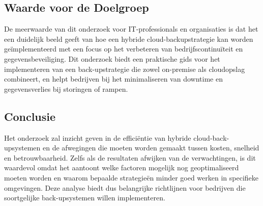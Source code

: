 \subsection{Waarde voor de Doelgroep}
De meerwaarde van dit onderzoek voor IT-professionals en organisaties is dat het een duidelijk beeld geeft van hoe een hybride cloud-backupstrategie kan worden geïmplementeerd met een focus op het verbeteren van bedrijfscontinuïteit en gegevensbeveiliging. Dit onderzoek biedt een praktische gids voor het implementeren van een back-upstrategie die zowel on-premise als cloudopslag combineert, en helpt bedrijven bij het minimaliseren van downtime en gegevensverlies bij storingen of rampen.

\subsection{Conclusie}
Het onderzoek zal inzicht geven in de efficiëntie van hybride cloud-back-upsystemen en de afwegingen die moeten worden gemaakt tussen kosten, snelheid en betrouwbaarheid. Zelfs als de resultaten afwijken van de verwachtingen, is dit waardevol omdat het aantoont welke factoren mogelijk nog geoptimaliseerd moeten worden en waarom bepaalde strategieën minder goed werken in specifieke omgevingen. Deze analyse biedt dus belangrijke richtlijnen voor bedrijven die soortgelijke back-upsystemen willen implementeren.


